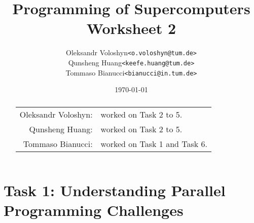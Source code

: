 \documentclass{article}
\title{Programming of Supercomputers\\Worksheet 2}
\author{
	\begin{tabular}{rl}
		Oleksandr Voloshyn& \texttt{<o.voloshyn@tum.de>}\\ 
		Qunsheng Huang& \texttt{<keefe.huang@tum.de>}\\ 
		Tommaso Bianucci& \texttt{<bianucci@in.tum.de>}
	\end{tabular}
}
\date{\today}
\begin{document}
\maketitle
\renewcommand{\abstractname}{Group members's contributions}
\begin{abstract}
	\begin{center}
		\begin{tabular}{rl}
		Oleksandr Voloshyn:& worked on Task 2 to 5. \\
		Qunsheng Huang:& worked on Task 2 to 5.\\
		Tommaso Bianucci:& worked on Task 1 and Task 6.\\
		\end{tabular}
	\end{center}
\end{abstract}

\section{Task 1: Understanding Parallel Programming Challenges}
\end{document}
